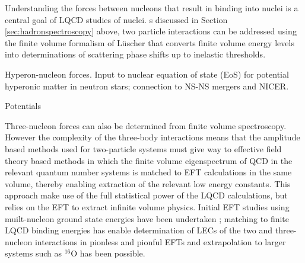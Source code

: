Understanding the  forces between nucleons that result in binding into nuclei is a central goal of LQCD studies of
nuclei. s discussed in Section \ref{sec:hadronspectroscopy} above, two particle interactions can be addressed using the finite volume formalism of L\"uscher that converts finite volume energy levels into determinations of scattering phase shifts up to inelastic thresholds. 

Hyperon-nucleon forces.  Input to nuclear equation of state (EoS) for potential hyperonic matter in neutron stars; connection to NS-NS mergers and NICER.

Potentials

Three-nucleon forces can also be determined from finite volume spectroscopy.  However the complexity of the three-body interactions means that the amplitude based methods used for two-particle systems must give way to effective field theory based methods \cite{Detmold:2012wpa,Detmold:2013wda,Detmold:2015jda,Kirscher:2015tka,Davoudi:2017ddj,Savage:2016egr} in which the finite volume eigenspectrum of QCD in the relevant quantum number systems is matched to EFT calculations in the same volume, thereby enabling extraction of the relevant low energy constants. This approach make use of the full statistical power of the LQCD calculations, but relies on the EFT to extract infinite volume physics. Initial EFT studies using muilt-nucleon ground state energies have been undertaken \cite{Barnea:2013uqa,Bansal:2017pwn,Contessi:2017rww}; matching to finite LQCD binding energies has enable determination of LECs of the two and three-nucleon interactions  in pionless and pionful EFTs and extrapolation to larger systems such as $^{16}$O has been possible.




